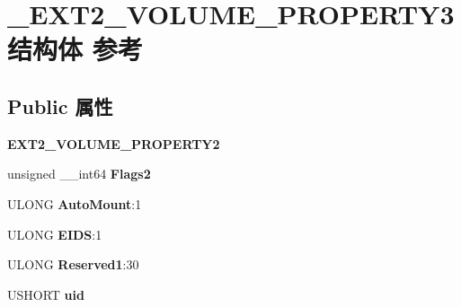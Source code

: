 \hypertarget{struct___e_x_t2___v_o_l_u_m_e___p_r_o_p_e_r_t_y3}{}\section{\+\_\+\+E\+X\+T2\+\_\+\+V\+O\+L\+U\+M\+E\+\_\+\+P\+R\+O\+P\+E\+R\+T\+Y3结构体 参考}
\label{struct___e_x_t2___v_o_l_u_m_e___p_r_o_p_e_r_t_y3}
\subsection*{Public 属性}
\begin{DoxyCompactItemize}
\item 
\mbox{\label{struct___e_x_t2___v_o_l_u_m_e___p_r_o_p_e_r_t_y3_a411f8ccb7b7b2ce060651714e5a49d50}} 
{\bfseries E\+X\+T2\+\_\+\+V\+O\+L\+U\+M\+E\+\_\+\+P\+R\+O\+P\+E\+R\+T\+Y2}
\item 
\mbox{\label{struct___e_x_t2___v_o_l_u_m_e___p_r_o_p_e_r_t_y3_afe401ce74de023a30af4736c6ad5e44f}} 
unsigned \+\_\+\+\_\+int64 {\bfseries Flags2}
\item 
\mbox{\label{struct___e_x_t2___v_o_l_u_m_e___p_r_o_p_e_r_t_y3_a6d9041a59214897fc91715998b9712db}} 
U\+L\+O\+NG {\bfseries Auto\+Mount}\+:1
\item 
\mbox{\label{struct___e_x_t2___v_o_l_u_m_e___p_r_o_p_e_r_t_y3_ac12fad7bad53f53f79a628a9b57e8b9d}} 
U\+L\+O\+NG {\bfseries E\+I\+DS}\+:1
\item 
\mbox{\label{struct___e_x_t2___v_o_l_u_m_e___p_r_o_p_e_r_t_y3_abfc7d07fc3239f50478dfd5f2eb6a633}} 
U\+L\+O\+NG {\bfseries Reserved1}\+:30
\item 
\mbox{\label{struct___e_x_t2___v_o_l_u_m_e___p_r_o_p_e_r_t_y3_a7e6cb0c85a05b16afb2106cbb2fb5068}} 
U\+S\+H\+O\+RT {\bfseries uid}
\item 
\mbox{\label{struct___e_x_t2___v_o_l_u_m_e___p_r_o_p_e_r_t_y3_a2b8c160502d4109ecdd30a0b6a79f28c}} 

\end{DoxyCompactItemize}
